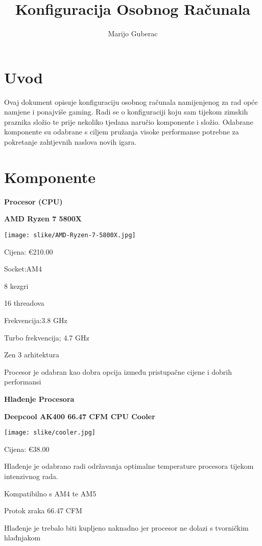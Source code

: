 \documentclass{article}
\title{Konfiguracija Osobnog Računala}
\author{Marijo Guberac}
\begin{document}
\maketitle

\section{Uvod}

\huge{Ovaj dokument opisuje konfiguraciju osobnog računala namijenjenog za rad opće namjene i ponajviše gaming. Radi se o konfiguraciji koju sam tijekom zimskih praznika složio te prije nekoliko tjedana naručio komponente i složio. Odabrane komponente su odabrane s ciljem pružanja visoke performanse potrebne za pokretanje zahtjevnih naslova novih igara.}
\newpage
\section{Komponente}




\large\textbf{Procesor (CPU)}\par

\large\textbf{AMD Ryzen 7 5800X}\par
    \texttt{[image: slike/AMD-Ryzen-7-5800X.jpg]}\par
Cijena: €210.00\par
Socket:AM4\par
8 kezgri\par
16 threadova\par
Frekvencija:3.8 GHz\par
Turbo frekvencija; 4.7 GHz\par
Zen 3 arhitektura\par
Procesor je odabran kao dobra opcija između pristupačne cijene i dobrih performansi

\newpage



\large\textbf{Hlađenje Procesora}\par

\textbf{Deepcool AK400 66.47 CFM CPU Cooler}\par
   \texttt{[image: slike/cooler.jpg]}\par
Cijena: €38.00\par
Hlađenje je odabrano radi održavanja optimalne temperature procesora tijekom intenzivnog rada.\par
Kompatibilno s AM4 te AM5\par
Protok zraka 66.47 CFM\par
Hlađenje je trebalo biti kupljeno naknadno jer procesor ne dolazi s tvorničkim hlađnjakom\par
\end{document}

